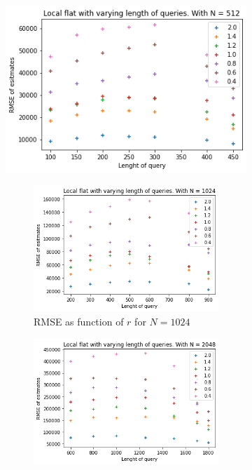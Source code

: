 \documentclass[11pt]{article}
\theoremstyle{definition}
\begin{document}
\begin{figure}[H]
\begin{subfigure}{.4\textwidth}
  \centering
  \includegraphics[width=\linewidth]{figures/local_flat/varying_r/loc_flat_varying_length_N=512.png}
  \caption{RMSE as function of $r$ for $N=512$}
  \label{fig:a}
  \begin{subfigure}{\textwidth}
  \centering
  \includegraphics[width=\linewidth]{figures/local_flat/varying_r/loc_flat_varying_length_N=1024.png}
  \caption{RMSE as function of $r$ for $N=1024$}
  \label{fig:a}
\end{subfigure}
\begin{subfigure}{\textwidth}
  \centering
  \includegraphics[width=\linewidth]{figures/local_flat/varying_r/loc_flat_varying_length_N=2048.png}

\end{subfigure}
\end{subfigure}
\end{figure}
\end{document}
